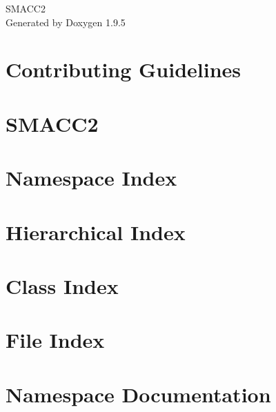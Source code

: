 \documentclass[twoside]{book}
\newcommand{\+}{\discretionary{\mbox{\scriptsize$\hookleftarrow$}}{}{}}
\newcommand{\clearemptydoublepage}{%
    \newpage{\pagestyle{empty}\cleardoublepage}%
  }
\begin{document}
  \raggedbottom
    \hypersetup{pageanchor=false,
                bookmarksnumbered=true,
                pdfencoding=unicode
               }
  \begin{titlepage}
  \vspace*{7cm}
  \begin{center}%
  {\Large SMACC2}\\
  \vspace*{1cm}
  {\large Generated by Doxygen 1.9.5}\\
  \end{center}
  \end{titlepage}
  \clearemptydoublepage
  \tableofcontents
  \clearemptydoublepage
  \hypersetup{pageanchor=true}
\chapter{Contributing Guidelines}
\label{md_CONTRIBUTING}

\chapter{SMACC2}
\label{md_README}

\chapter{Namespace Index}

\chapter{Hierarchical Index}

\chapter{Class Index}

\chapter{File Index}

\chapter{Namespace Documentation}














\end{document}
